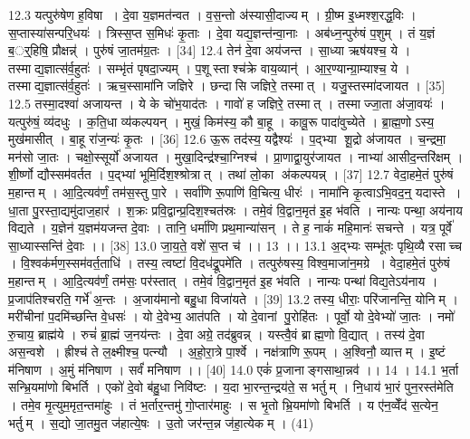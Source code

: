 12.3
यत्पुरु॑षेण ह॒विषा । दे॒वा य॒ज्ञमत॑न्वत । व॒स॒न्तो अ॑स्यासी॒दाज्यम् । ग्री॒ष्म इ॒ध्मश्श॒रद्ध॒विः । स॒प्तास्या॑सन्परि॒धयः॑ । त्रिस्स॒प्त स॒मिधः॑ कृ॒ताः । दे॒वा यद्य॒ज्ञन्त॑न्वा॒नाः । अब॑ध्न॒न्पुरु॑षं प॒शुम् । तं य॒ज्ञं ब॒र््॒हिषि॒ प्रौक्षन्न्॑ । पुरु॑षं जा॒तम॑ग्र॒तः । [34]
12.4
तेन॑ दे॒वा अय॑जन्त । सा॒ध्या ऋष॑यश्च॒ ये । तस्माद्य॒ज्ञात्स॑र्व॒हुतः॑ । सम्भृ॑तं पृषदा॒ज्यम् । प॒शूस्ताश्च॑क्रे वाय॒व्यान्॑ । आ॒र॒ण्यान्ग्रा॒म्याश्च॒ ये । तस्माद्य॒ज्ञात्स॑र्व॒हुतः॑ । ऋच॒स्सामा॑नि जज्ञिरे । छन्दा॑सि जज्ञिरे॒ तस्मात् । यजु॒स्तस्मा॑दजायत । [35]
12.5
तस्मा॒दश्वा॑ अजायन्त । ये के चो॑भ॒याद॑तः । गावो॑ ह जज्ञिरे॒ तस्मात् । तस्माज्जा॒ता अ॑जा॒वयः॑ । यत्पुरु॑षं॒ व्य॑दधुः । क॒ति॒धा व्य॑कल्पयन् । मुखं॒ किम॑स्य॒ कौ बा॒हू । कावू॒रू पादा॑वुच्येते । ब्रा॒ह्म॒णोऽस्य॒ मुख॑मासीत् । बा॒हू रा॑ज॒न्यः॑ कृ॒तः । [36]
12.6
ऊ॒रू तद॑स्य॒ यद्वैश्यः॑ । प॒द्भ्या शू॒द्रो अ॑जायत । च॒न्द्रमा॒ मन॑सो जा॒तः । चक्षो॒स्सूर्यो॑ अजायत । मुखा॒दिन्द्र॑श्चा॒ग्निश्च॑ । प्रा॒णाद्वा॒युर॑जायत । नाभ्या॑ आसीद॒न्तरि॑क्षम् । शी॒र्ष्णो द्यौस्सम॑वर्तत । प॒द्भ्यां भूमि॒र्दिश॒श्श्रोत्रात् । तथा॑ लो॒का अ॑कल्पयन्न् । [37]
12.7
वेदा॒हमे॒तं पुरु॑षं म॒हान्तम् । आ॒दि॒त्यव॑र्णं॒ तम॑स॒स्तु पा॒रे । सर्वा॑णि रू॒पाणि॑ वि॒चित्य॒ धीरः॑ । नामा॑नि कृ॒त्वाऽभि॒वद॒न्॒ यदास्ते । धा॒ता पु॒रस्ता॒द्यमु॑दाज॒हार॑ । श॒क्रः प्रवि॒द्वान्प्र॒दिश॒श्चत॑स्रः । तमे॒वं वि॒द्वान॒मृत॑ इ॒ह भ॑वति । नान्यः पन्था॒ अय॑नाय विद्यते । य॒ज्ञेन॑ य॒ज्ञम॑यजन्त दे॒वाः । तानि॒ धर्मा॑णि प्रथ॒मान्या॑सन् । ते ह॒ नाकं॑ महि॒मानः॑ सचन्ते । यत्र॒ पूर्वे॑ सा॒ध्यास्सन्ति॑ दे॒वाः ।। [38]
13.0
जा॒य॒ते॒ वशे॑ स॒प्त च॑ ।। 13 ।।
13.1
अ॒द्भ्यः सम्भू॑तः पृथि॒व्यै रसाच्च । वि॒श्वक॑र्मण॒स्सम॑वर्त॒ताधि॑ । तस्य॒ त्वष्टा॑ वि॒दध॑द्रू॒पमे॑ति । तत्पुरु॑षस्य॒ विश्व॒माजा॑न॒मग्रे । वेदा॒हमे॒तं पुरु॑षं म॒हान्तम् । आ॒दि॒त्यव॑र्णं॒ तम॑सः॒ पर॑स्तात् । तमे॒वं वि॒द्वान॒मृत॑ इ॒ह भ॑वति । नान्यः पन्था॑ विद्य॒तेऽय॑नाय । प्र॒जाप॑तिश्चरति॒ गर्भे॑ अ॒न्तः । अ॒जाय॑मानो बहु॒धा विजा॑यते । [39]
13.2
तस्य॒ धीराः॒ परि॑जानन्ति॒ योनिम् । मरी॑चीनां प॒दमि॑च्छन्ति वे॒धसः॑ । यो दे॒वेभ्य॒ आत॑पति । यो दे॒वानां पु॒रोहि॑तः । पूर्वो॒ यो दे॒वेभ्यो॑ जा॒तः । नमो॑ रु॒चाय॒ ब्राह्म॑ये । रुचं॑ ब्रा॒ह्मं ज॒नय॑न्तः । दे॒वा अग्रे॒ तद॑ब्रुवन्न् । यस्त्वै॒वं ब्राह्म॒णो वि॒द्यात् । तस्य॑ दे॒वा अस॒न्वशे । ह्रीश्च॑ ते ल॒क्ष्मीश्च॒ पत्न्यौ । अ॒हो॒रा॒त्रे पा॒र्श्वे । नक्ष॑त्राणि रू॒पम् । अ॒श्विनौ॒ व्यात्तम् । इ॒ष्टं म॑निषाण । अ॒मुं म॑निषाण । सर्वं॑ मनिषाण ।। [40]
14.0
एकं॑ प्र॒जानाङ्गसाथा॒न्नव॑ ।। 14 ।
14.1
भ॒र्ता सन्भ्रि॒यमा॑णो बिभर्ति । एको॑ दे॒वो ब॑हु॒धा निवि॑ष्टः । य॒दा भा॒रन्त॒न्द्रय॑ते॒ स भर्तुम् । नि॒धाय॑ भा॒रं पुन॒रस्त॑मेति । तमे॒व मृ॒त्युम॒मृत॒न्तमा॑हुः । तं भ॒र्तार॒न्तमु॑ गो॒प्तार॑माहुः । स भृ॒तो भ्रि॒यमा॑णो बिभर्ति । य ए॑न॒व्वेँद॑ स॒त्येन॒ भर्तुम् । स॒द्यो जा॒तमु॒त ज॑हात्ये॒षः । उ॒तो जर॑न्त॒न्न ज॑हा॒त्येकम् । (41)
